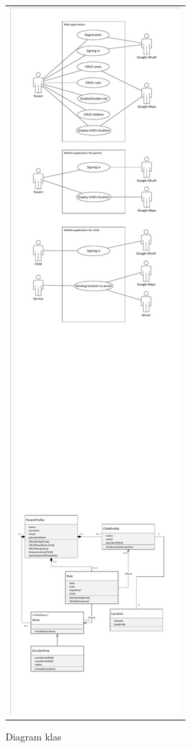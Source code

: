\documentclass{sprawozdanie-agh}
\begin{document}
		\begin{figure}[H]
			\centering
			\begin{tabular}{c}
				\includegraphics[width=.95\textwidth]{classes} 
			\end{tabular}
		\caption{Diagram klas}
		\end{figure}
\end{document}
